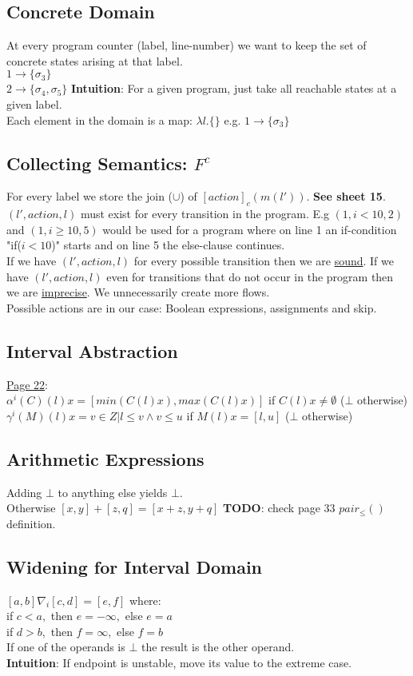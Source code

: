 \subsection{Concrete Domain}
At every program counter (label, line-number) we want to keep the set of concrete states arising at that label. \\
$1 \to \{\sigma_3\}$\\
$2 \to \{\sigma_4, \sigma_5\}$
\textbf{Intuition}: For a given program, just take all reachable states at a given label. \\
Each element in the domain is a map: $\lambda l . \{\}$ e.g. $1 \to \{\sigma_3\}$
\subsection{Collecting Semantics: $F^c$}
For every label we store the join ($\cup$) of $[action]_c(m(l'))$. \textbf{See sheet 15}.\\
$(l',action,l)$ must exist for every transition in the program. E.g $(1,i<10,2)$ and $(1,i \geq 10,5)$ would be used for a program where on line 1 an if-condition "if($i<10$)" starts and on line 5 the else-clause continues.\\
If we have $(l',action,l)$ for every possible transition then we are \underline{sound}. If we have $(l',action,l)$ even for transitions that do not occur in the program then we are \underline{imprecise}. We unnecessarily create more flows.\\
Possible actions are in our case: Boolean expressions, assignments and skip.

\subsection{Interval Abstraction}
\underline{Page 22}:\\ 
$\alpha^i(C)(l)x = [min(C(l)x), max(C(l)x)]$ if $C(l)x \neq \emptyset$ ($\bot$ otherwise)\\
$\gamma^i(M)(l)x = {v \in Z| l \leq v \wedge v \leq u}$ if $M(l)x = [l,u]$ ($\bot$ otherwise)

\subsection{Arithmetic Expressions}
Adding $\bot$ to anything else yields $\bot$.\\
Otherwise $[x,y] + [z,q] = [x+z,y+q]$
\textbf{TODO}: check page 33 $pair_{\leq}()$ definition.

\subsection{Widening for Interval Domain}
$[a,b] \nabla_i [c,d] = [e,f]$ where:\\
if $ c < a,$ then $e = -\infty,$ else $e=a$\\
if $d > b,$ then $f = \infty,$ else $f = b$\\
If one of the operands is $\bot$ the result is the other operand.\\
\textbf{Intuition}: If endpoint is unstable, move its value to the extreme case.
